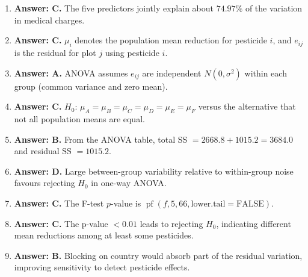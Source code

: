 \documentclass[11pt]{article}
\begin{document}
\begin{enumerate}[label=\textbf{Q\arabic*:}, leftmargin=*, itemsep=0.9em]
\item \textbf{Answer: C.} The five predictors jointly explain about $74.97\%$ of the variation in medical charges.
\item \textbf{Answer: C.} $\mu_i$ denotes the population mean reduction for pesticide $i$, and $e_{ij}$ is the residual for plot $j$ using pesticide $i$.
\item \textbf{Answer: A.} ANOVA assumes $e_{ij}$ are independent $N(0,\sigma^2)$ within each group (common variance and zero mean).
\item \textbf{Answer: C.} $H_0$: $\mu_A=\mu_B=\mu_C=\mu_D=\mu_E=\mu_F$ versus the alternative that not all population means are equal.
\item \textbf{Answer: B.} From the ANOVA table, total SS $=2668.8+1015.2=3684.0$ and residual SS $=1015.2$.
\item \textbf{Answer: D.} Large between-group variability relative to within-group noise favours rejecting $H_0$ in one-way ANOVA.
\item \textbf{Answer: C.} The F-test $p$-value is $\operatorname{pf}(f,5,66,\text{lower.tail}=\text{FALSE})$.
\item \textbf{Answer: C.} The p-value $<0.01$ leads to rejecting $H_0$, indicating different mean reductions among at least some pesticides.
\item \textbf{Answer: B.} Blocking on country would absorb part of the residual variation, improving sensitivity to detect pesticide effects.
\end{enumerate}
\end{document}
